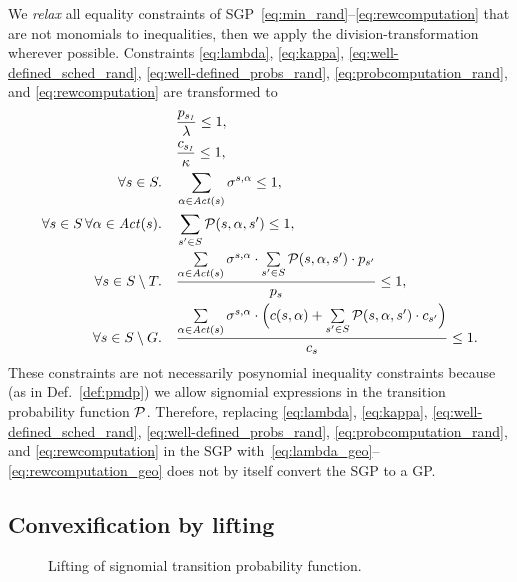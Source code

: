 We \emph{relax} all equality constraints of SGP~\eqref{eq:min_rand}--\eqref{eq:rewcomputation} that are not monomials to inequalities, then we apply the division-transformation wherever possible. Constraints \eqref{eq:lambda}, \eqref{eq:kappa}, \eqref{eq:well-defined_sched_rand}, \eqref{eq:well-defined_probs_rand}, \eqref{eq:probcomputation_rand}, and \eqref{eq:rewcomputation} are transformed to
\begin{align}
							 &\quad \frac{p_{s_{\mathit{I}}}}{\lambda}\leq 1\label{eq:lambda_geo},\\
							 &\quad \frac{c_{s_{\mathit{I}}}}{\kappa}\leq 1\label{eq:kappa_geo},\\
			\forall s\in S.	&\quad \sum_{\alpha\in\mathit{Act}(s)}\sigma^{s,\alpha}\leq 1\label{eq:welldefined_sched_rand_geo},\\			
			\forall s\in S\, \forall\alpha\in\mathit{Act}(s).	 &\quad \sum_{s'\in S}\mathcal{P}(s,\alpha,s')\leq 1\label{eq:well-defined_probs_rand_geo},\\
			\forall s\in S\setminus T.	&\quad \frac{\sum\limits_{\alpha\in\mathit{Act}(s)}\sigma^{s,\alpha}\cdot\sum\limits_{s'\in S}	\mathcal{P}(s,\alpha,s')\cdot p_{s'}}{p_s}\leq 1\label{eq:probcomputation_rand_geo},\\
			\forall s\in S\setminus G.	&\quad \frac{\sum\limits_{\alpha\in\mathit{Act}(s)} \sigma^{s,\alpha} \cdot \Bigl(c(s,\alpha) + \sum\limits_{s'\in S}	\mathcal{P} (s,\alpha,s') \cdot c_{s'}\Bigr)}{c_s}\leq 1 \label{eq:rewcomputation_geo}.
		\end{align}
%
These constraints are not necessarily posynomial inequality constraints because (as in Def.~\ref{def:pmdp}) we allow signomial expressions in the transition probability function $\mathcal{P}$. Therefore, replacing \eqref{eq:lambda}, \eqref{eq:kappa}, \eqref{eq:well-defined_sched_rand}, \eqref{eq:well-defined_probs_rand}, \eqref{eq:probcomputation_rand}, and \eqref{eq:rewcomputation} in the SGP with~\eqref{eq:lambda_geo}--\eqref{eq:rewcomputation_geo} does not by itself convert the SGP to a GP.

\subsection{Convexification by lifting}\label{sec:lifting}
%
\begin{figure}[t]\centering
	\hspace{1cm}
\caption{Lifting of signomial transition probability function.}
\end{figure}


